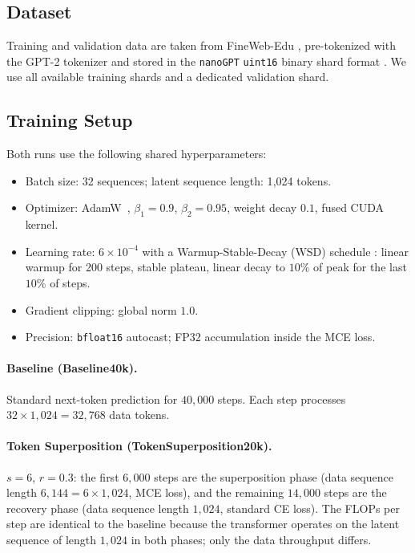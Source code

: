 \documentclass{article}
\begin{document}
\subsection{Dataset}

Training and validation data are taken from FineWeb-Edu
\citep{lozhkov2024fineweb-edu}, pre-tokenized with the GPT-2 tokenizer and stored
in the \texttt{nanoGPT} \texttt{uint16} binary shard format
\citep{karpathy2022nanogpt}.
We use all available training shards and a dedicated validation shard.

\subsection{Training Setup}

Both runs use the following shared hyperparameters:
\begin{itemize}
    \item Batch size: 32 sequences; latent sequence length: 1{,}024 tokens.
    \item Optimizer: AdamW~\citep{loshchilov2017decoupled}, $\beta_1=0.9$,
          $\beta_2=0.95$, weight decay $0.1$, fused CUDA kernel.
    \item Learning rate: $6\times10^{-4}$ with a Warmup-Stable-Decay
          (WSD) schedule \citep{hu2024minicpm}:
          linear warmup for 200 steps, stable plateau, linear decay to
          $10\%$ of peak for the last $10\%$ of steps.
    \item Gradient clipping: global norm $1.0$.
    \item Precision: \texttt{bfloat16} autocast; FP32 accumulation inside
          the MCE loss.
\end{itemize}

\paragraph{Baseline (Baseline40k).}
Standard next-token prediction for $40{,}000$ steps.
Each step processes $32\times 1{,}024 = 32{,}768$ data tokens.

\paragraph{Token Superposition (TokenSuperposition20k).}
$s=6$, $r=0.3$: the first $6{,}000$ steps are the superposition phase
(data sequence length $6{,}144 = 6 \times 1{,}024$, MCE loss),
and the remaining $14{,}000$ steps are the recovery phase
(data sequence length $1{,}024$, standard CE loss).
The FLOPs per step are identical to the baseline because the transformer
operates on the latent sequence of length $1{,}024$ in both phases;
only the data throughput differs.
\end{document}

